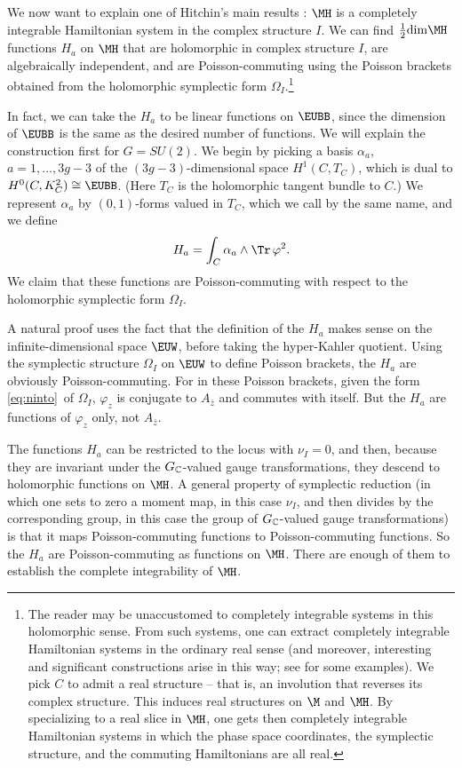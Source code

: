  
 

 We now want to explain one of Hitchin's main
results \cite{ref62}: $\MH$ is a completely integrable Hamiltonian system
in the complex structure $I$.  We can find ${1\over 2}{\rm
dim}\MH$ functions $H_a$ on $\MH$ that are holomorphic in complex
structure $I$, are algebraically independent, and are
Poisson-commuting using the Poisson brackets obtained from the
holomorphic symplectic form $\Omega_I$.\footnote{The reader may be
unaccustomed to completely integrable systems in this holomorphic
sense.  {}From such systems, one can extract completely integrable
Hamiltonian systems in the ordinary real sense (and moreover,
interesting and significant constructions arise in this way; see
\cite{ref63,ref64} for some examples). We pick $C$ to admit
a real structure -- that is, an involution that reverses its
complex structure. This induces real structures on $\M$ and $\MH$.
By specializing to a real slice in $\MH$, one gets then completely
integrable Hamiltonian systems in which the phase space
coordinates, the symplectic structure, and the commuting
Hamiltonians are all real.}

In fact, we can take the $H_a$ to be linear functions on
${\EUBB}$, since the dimension of ${\EUBB}$ is the same as the
desired number of functions.   We will explain the construction
first for $G=SU(2)$. We begin by picking  a basis $\alpha_a$,
$a=1,\dots,3g-3$ of the $(3g-3)$-dimensional space $ H^1(C,T_C)$,
which is dual to $H^0(C, K_C^2)\cong {\EUBB}$. (Here $T_C$ is the
holomorphic tangent bundle to $C$.) We represent $\alpha_a$ by
$(0,1)$-forms valued in $T_C$, which we call by the same name, and
we define %
\setcounter{equation}{25}
\begin{equation}\label{eq:miro}
H_a=\int_C\alpha_a \wedge \Tr\,\varphi^2.
\end{equation}
 We
claim that these functions are Poisson-commuting with respect to
the holomorphic symplectic form $\Omega_I$.

A natural proof uses the fact that the definition of the $H_a$
makes sense on the infinite-dimensional space $\EUW$, before
taking the hyper-Kahler quotient.  Using the symplectic structure
$\Omega_I$ on $\EUW$ to define Poisson brackets, the $H_a$ are
obviously Poisson-commuting. For in these Poisson brackets, given
the form \eqref{eq:ninto}\ of $\Omega_I$, $\varphi_z$ is conjugate to
$A_{\bar z}$ and commutes with itself. But the $H_a$ are functions
of $\varphi_z$ only, not $A_{\bar z}$.

The functions $H_a$ can be restricted to the locus with $\nu_I=0$,
and then, because they are invariant under the
$G_{\Bbb{C}}$-valued gauge transformations, they descend to
holomorphic functions on $\MH$. A general property of symplectic
reduction (in which one sets to zero a moment map, in this case
$\nu_I$, and then divides by the corresponding group, in this case
the group of $G_{\Bbb{C}}$-valued gauge transformations) is that
it maps Poisson-commuting functions to Poisson-commuting
functions.  So the $H_a$ are Poisson-commuting as functions on
$\MH$.  There are enough of them to establish the complete
integrability of $\MH$.

